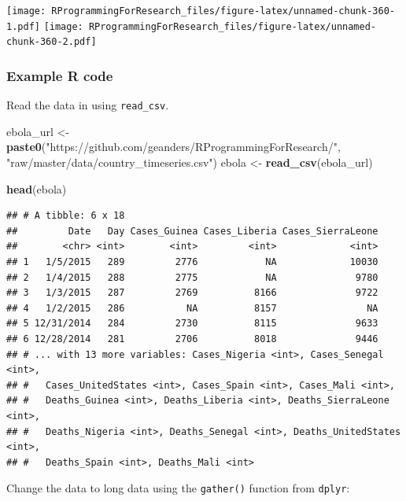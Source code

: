 \documentclass[]{book}
\makeatletter
\newenvironment{Shaded}{\begin{snugshade}}{\end{snugshade}}
\newcommand{\KeywordTok}[1]{\textcolor[rgb]{0.13,0.29,0.53}{\textbf{#1}}}
\newcommand{\DataTypeTok}[1]{\textcolor[rgb]{0.13,0.29,0.53}{#1}}
\newcommand{\StringTok}[1]{\textcolor[rgb]{0.31,0.60,0.02}{#1}}
\newcommand{\OperatorTok}[1]{\textcolor[rgb]{0.81,0.36,0.00}{\textbf{#1}}}
\newcommand{\NormalTok}[1]{#1}
\newenvironment{kframe}{%
\medskip{}
\setlength{\fboxsep}{.8em}
 \def\at@end@of@kframe{}%
 \ifinner\ifhmode%
  \def\at@end@of@kframe{\end{minipage}}%
  \begin{minipage}{\columnwidth}%
 \fi\fi%
 \def\FrameCommand##1{\hskip\@totalleftmargin \hskip-\fboxsep
 \colorbox{shadecolor}{##1}\hskip-\fboxsep
     \hskip-\linewidth \hskip-\@totalleftmargin \hskip\columnwidth}%
 \MakeFramed {\advance\hsize-\width
   \@totalleftmargin\z@ \linewidth\hsize
   \@setminipage}}%
 {\par\unskip\endMakeFramed%
 \at@end@of@kframe}
\renewenvironment{Shaded}{\begin{kframe}}{\end{kframe}}
\theoremstyle{definition}
\theoremstyle{definition}
\theoremstyle{definition}
\theoremstyle{remark}
\makeatother
\begin{document}
\texttt{[image: RProgrammingForResearch\_files/figure-latex/unnamed-chunk-360-1.pdf]}
\texttt{[image: RProgrammingForResearch\_files/figure-latex/unnamed-chunk-360-2.pdf]}

\subsubsection{Example R code}\label{example-r-code-11}

Read the data in using \texttt{read\_csv}.

\begin{Shaded}
\begin{Highlighting}[]
\NormalTok{ebola_url <-}\StringTok{ }\KeywordTok{paste0}\NormalTok{(}\StringTok{"https://github.com/geanders/RProgrammingForResearch/"}\NormalTok{,}
              \StringTok{"raw/master/data/country_timeseries.csv"}\NormalTok{)}
\NormalTok{ebola <-}\StringTok{ }\KeywordTok{read_csv}\NormalTok{(ebola_url)}

\KeywordTok{head}\NormalTok{(ebola)}
\end{Highlighting}
\end{Shaded}

\begin{verbatim}
## # A tibble: 6 x 18
##         Date   Day Cases_Guinea Cases_Liberia Cases_SierraLeone
##        <chr> <int>        <int>         <int>             <int>
## 1   1/5/2015   289         2776            NA             10030
## 2   1/4/2015   288         2775            NA              9780
## 3   1/3/2015   287         2769          8166              9722
## 4   1/2/2015   286           NA          8157                NA
## 5 12/31/2014   284         2730          8115              9633
## 6 12/28/2014   281         2706          8018              9446
## # ... with 13 more variables: Cases_Nigeria <int>, Cases_Senegal <int>,
## #   Cases_UnitedStates <int>, Cases_Spain <int>, Cases_Mali <int>,
## #   Deaths_Guinea <int>, Deaths_Liberia <int>, Deaths_SierraLeone <int>,
## #   Deaths_Nigeria <int>, Deaths_Senegal <int>, Deaths_UnitedStates <int>,
## #   Deaths_Spain <int>, Deaths_Mali <int>
\end{verbatim}

Change the data to long data using the \texttt{gather()} function from
\texttt{dplyr}:

\begin{Shaded}
\end{Shaded}
\end{document}
